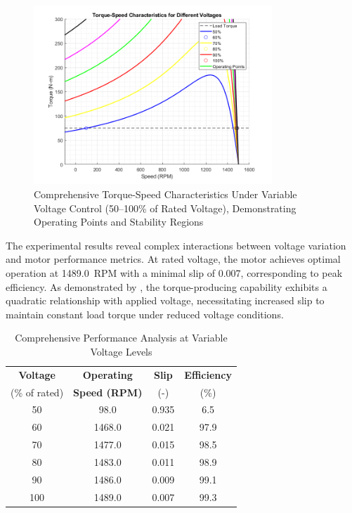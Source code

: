 \documentclass[a4paper,12pt]{article}
\begin{document}
\begin{figure}[htbp]
    \centering
    \includegraphics[width=0.8\textwidth]{voltage_speed_control.png}
    \caption{Comprehensive Torque-Speed Characteristics Under Variable Voltage Control (50--100\% of Rated Voltage), Demonstrating Operating Points and Stability Regions}
    \label{fig:voltage_control}
\end{figure}

The experimental results reveal complex interactions between voltage variation and motor performance metrics. At rated voltage, the motor achieves optimal operation at 1489.0~RPM with a minimal slip of 0.007, corresponding to peak efficiency. As demonstrated by \cite{Boldea2014}, the torque-producing capability exhibits a quadratic relationship with applied voltage, necessitating increased slip to maintain constant load torque under reduced voltage conditions.

\begin{table}[htbp]
    \centering
    \caption{Comprehensive Performance Analysis at Variable Voltage Levels}
    \begin{tabular}{|c|c|c|c|}
        \hline
        \textbf{Voltage} & \textbf{Operating} & \textbf{Slip} & \textbf{Efficiency} \\
        (\% of rated) & \textbf{Speed (RPM)} & (-) & (\%) \\
        \hline
        50 & 98.0 & 0.935 & 6.5 \\
        60 & 1468.0 & 0.021 & 97.9 \\
        70 & 1477.0 & 0.015 & 98.5 \\
        80 & 1483.0 & 0.011 & 98.9 \\
        90 & 1486.0 & 0.009 & 99.1 \\
        100 & 1489.0 & 0.007 & 99.3 \\
        \hline
    \end{tabular}
    \label{tab:voltage_control}
\end{table}
\end{document}

